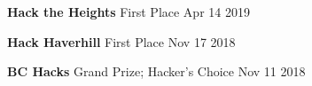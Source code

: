 \documentclass[10pt]{article}
\renewcommand{\date}[2]{#1 #2}
\begin{document}
\begin{minipage}[t]{0.25\textwidth}
\begin{flushleft}
    \textbf{Hack the Heights} \newline
    First Place \newline
    \date{Apr 14}{2019}

    \vspace{0.25cm}

    \textbf{Hack Haverhill} \newline
    First Place \newline
    \date{Nov 17}{2018}

    \vspace{0.25cm}

    \textbf{BC Hacks} \newline
    Grand Prize; Hacker's Choice \newline
    \date{Nov 11}{2018}
  \end{flushleft}
\end{minipage}
\hfill
\end{document}
